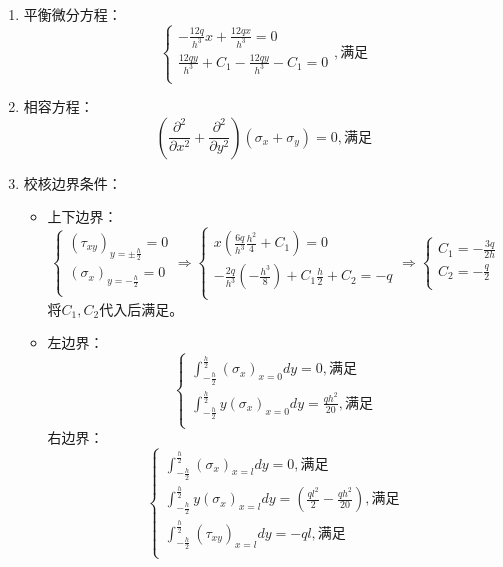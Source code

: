 	\begin{remark}
		\quad\\
		\begin{enumerate}
			\item 平衡微分方程：\[\begin{cases}
			-\frac{12q}{h^3}x+\frac{12qx}{h^3}=0\\
			\frac{12qy}{h^3}+C_1-\frac{12qy}{h^3}-C_1=0\\
			\end{cases},\text{满足}\]
			\item 相容方程：\[\left( \frac{\partial ^2}{\partial x^2}+\frac{\partial ^2}{\partial y^2} \right) \left( \sigma _x+\sigma _y \right) =0,\text{满足}\]
			\item 校核边界条件：
			\begin{itemize}
				\item 上下边界：\[\begin{cases}
				\left( \tau _{xy} \right) _{y=\pm \frac{h}{2}}=0\\
				\left( \sigma _x \right) _{y=-\frac{h}{2}}=0\\
				\end{cases}\Longrightarrow \begin{cases}
				x\left( \frac{6q}{h^3}\frac{h^2}{4}+C_1 \right) =0\\
				-\frac{2q}{h^3}\left( -\frac{h^3}{8} \right) +C_1\frac{h}{2}+C_2=-q\\
				\end{cases}\Longrightarrow \begin{cases}
				C_1=-\frac{3q}{2h}\\
				C_2=-\frac{q}{2}\\
				\end{cases}\]
				将$C_1,C_2$代入后满足。\\
				\item 左边界：\[\begin{cases}
				\int_{-\frac{h}{2}}^{\frac{h}{2}}{\left( \sigma _x \right) _{x=0}dy}=0,\text{满足}\\
				\int_{-\frac{h}{2}}^{\frac{h}{2}}{y\left( \sigma _x \right)_{x=0} dy}=\frac{qh^2}{20},\text{满足}\\
				\end{cases}\]
				右边界：\[\begin{cases}
				\int_{-\frac{h}{2}}^{\frac{h}{2}}{\left( \sigma _x \right) _{x=l}dy}=0,\text{满足}\\
				\int_{-\frac{h}{2}}^{\frac{h}{2}}{y\left( \sigma _x \right) _{x=l}dy}=\left( \frac{ql^2}{2}-\frac{qh^2}{20} \right) ,\text{满足}\\
				\int_{-\frac{h}{2}}^{\frac{h}{2}}{\left( \tau _{xy} \right) _{x=l}dy=-ql,\text{满足}}\\
				\end{cases}\]
			\end{itemize}
		\end{enumerate}
	\end{remark}

